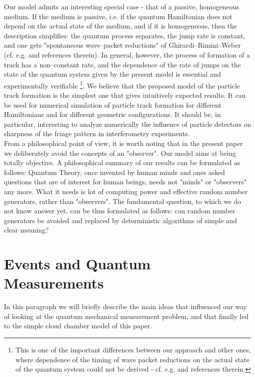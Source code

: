 \documentclass[12pt]{article}
\begin{document}
Our model admits an interesting special case - that of a passive,
homogeneous medium. If the medium is passive, i.e. if the quantum
Hamiltonian does not depend on the actual state of the medium, and if it is
homogeneous, then the description simplifies: the quantum process
separates, the jump rate is constant, and one gets "spontaneous
wave--packet reductions" of Ghirardi--Rimini--Weber (cf. e.g. \cite{ghi1}
and references therein). In general, however, the process of formation of a
track has a non--constant rate, and the dependence of the rate of jumps on
the state of the quantum system given by the present model is essential and
experimentally verifiable \footnote{This is one of the important
differences between our approach and other ones, where dependence of the
timing of wave packet reductions on the actual state of the quantum system
could not be derived - cf. e.g.\cite{cav1} and references therein.}. We
believe that the proposed model of the particle track formation is the
simplest one that gives intuitively expected results. It can be used for
numerical simulation of particle track formation for different Hamiltonians
and for different geometric configurations. It should be, in particular,
interesting to analyze numerically the influence of particle detectors on
sharpness of the fringe pattern in interferometry experiments.\\
{}From a philosophical point of view, it is worth noting that in the present
paper we deliberately avoid the concepts of an "observer". Our model aims
at being totally objective. A philosophical summary of our results can be
formulated as follows: Quantum Theory, once invented by human minds and
ones asked questions that are of interest for human beings, needs not
"minds" or "observers" any more. What it needs is lot of computing power
and effective random number generators, rather than "observers". The
fundamental question, to which we do not know answer yet, can be thus
formulated as follows: can random number generators be avoided and replaced
by deterministic algorithms of simple and clear meaning?

\section{Events and Quantum Measurements}
In this paragraph we will briefly describe the main ideas that influenced
our way of looking at the quantum mechanical measurement problem, and that
finally led to the simple cloud chamber model of this paper.
\end{document}

